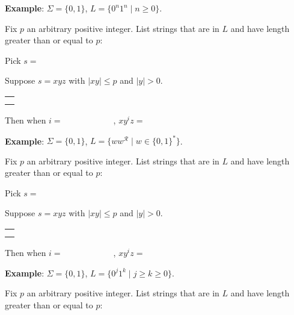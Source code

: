\newpage
{\bf Example}: $\Sigma  =  \{0,1\}$, $L = \{ 0^n 1^n \mid n  \geq 0\}$.

Fix $p$ an arbitrary positive integer. List strings that are in $L$ and have length  greater than or equal  to $p$:

\vspace{20pt}

Pick $s = $


Suppose $s = xyz$ with  $|xy|  \leq  p$ and $|y| > 0$.
\begin{center}
\begin{tabular}{|c|}
\hline
 \\
\hspace{4in} \\
\hline
\end{tabular}
\end{center}

Then when $i = \hspace{1in}$, $xy^i z  = \hspace{1in}$

\newpage

{\bf Example}: $\Sigma  =  \{0,1\}$, $L = \{w w^{\mathcal{R}} \mid w \in \{0,1\}^*\}$.

Fix $p$ an arbitrary positive integer. List strings that are in $L$ and have length  greater than or equal  to $p$:

\vspace{10pt}

Pick $s = $

Suppose $s = xyz$ with  $|xy|  \leq  p$ and $|y| > 0$.
\begin{center}
\begin{tabular}{|c|}
\hline
 \\
\hspace{4in} \\
\hline
\end{tabular}
\end{center}
Then when $i = \hspace{1in}$, $xy^i z  = \hspace{1in}$


\vspace{30pt} 

{\bf Example}: $\Sigma  =  \{0,1\}$, $L = \{0^j1^k  \mid j \geq k  \geq 0\}$.

Fix $p$ an arbitrary positive integer. List strings that are in $L$ and have length  greater than or equal  to $p$:

\vspace{10pt}

